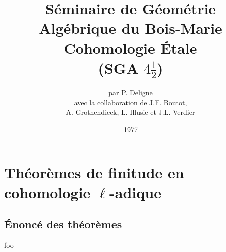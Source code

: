 \documentclass[oneside]{book} %
\title{Séminaire de Géométrie Algébrique du Bois-Marie \\ \vspace{20pt}
Cohomologie Étale \\ \vspace{20pt}
(SGA $4\frac 1 2$)}
\author{par P. Deligne \vspace{10pt}\\ 
avec la collaboration de J.F. Boutot, \\ A. Grothendieck, L. Illusie et J.L. Verdier}
\date{1977}
\begin{document}
\maketitle










\tableofcontents
{} %











\chapter{Théorèmes de finitude en cohomologie \texorpdfstring{$\ell$}{l}-adique}\label{VII}

\section{Énoncé des théorèmes}\label{VII:1}

\begin{theorem_}\label{VII:1-1}
foo
\end{theorem_}














\end{document}
